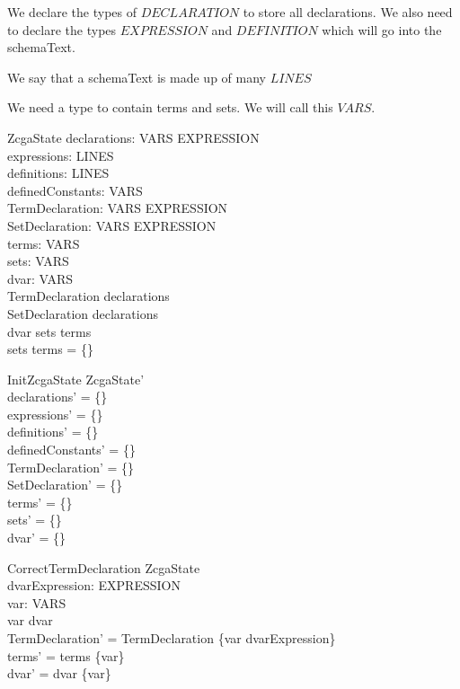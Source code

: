 \documentclass{article}
\begin{document}
We declare the types of $DECLARATION$ to store all declarations.
We also need to declare the types $EXPRESSION$ and $DEFINITION$ which will go into the schemaText.

We say that a schemaText is made up of many $LINES$
\begin{zed}
\end{zed}

We need a type to contain terms and sets. We will call this $VARS$.

\begin{zed}
[VARS]
\end{zed}

\begin{schema}{ZcgaState}
declarations: VARS \rel EXPRESSION \\
expressions: \power LINES \\
definitions: \power LINES \\
definedConstants: \power VARS \\
TermDeclaration: VARS \rel EXPRESSION \\
SetDeclaration: VARS \rel EXPRESSION \\
terms: \power VARS \\
sets: \power VARS\\
dvar: \power VARS \\
\where
TermDeclaration \subseteq declarations \\
SetDeclaration \subseteq declarations \\
dvar \subset sets \cup terms \\
sets \cap terms = \{\}
\end{schema}

\begin{schema}{InitZcgaState}
ZcgaState' \\
\where
declarations' = \{\} \\
expressions' = \{\} \\
definitions' = \{\} \\
definedConstants' = \{\} \\
TermDeclaration' = \{\} \\
SetDeclaration' = \{\} \\
terms' = \{\} \\
sets' = \{\} \\
dvar' = \{\} \\
\end{schema}

\begin{schema}{CorrectTermDeclaration}
\Delta ZcgaState \\
dvarExpression: EXPRESSION \\
var: VARS \\
\where
var \notin dvar \\
TermDeclaration' = TermDeclaration \cup \{var \mapsto dvarExpression\} \\
terms' = terms \cup \{var\} \\
dvar' = dvar \cup \{var\}
\end{schema}
\end{document}
